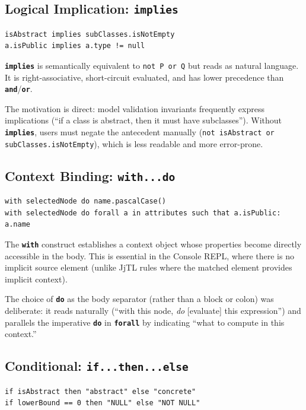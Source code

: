 \documentclass[11pt,a4paper]{article}
\newcommand{\jjtl}{\textsf{JjTL}}
\newcommand{\kw}[1]{\texttt{\textbf{#1}}}
\begin{document}
\subsection{Logical Implication: \texttt{implies}}

\begin{lstlisting}[style=jjel,numbers=none]
isAbstract implies subClasses.isNotEmpty
a.isPublic implies a.type != null
\end{lstlisting}

\kw{implies} is semantically equivalent to \texttt{not P or Q} but reads as natural language. It is right-associative, short-circuit evaluated, and has lower precedence than \kw{and}/\kw{or}.

The motivation is direct: model validation invariants frequently express implications (``if a class is abstract, then it must have subclasses''). Without \kw{implies}, users must negate the antecedent manually (\texttt{not isAbstract or subClasses.isNotEmpty}), which is less readable and more error-prone.


\subsection{Context Binding: \texttt{with...do}}

\begin{lstlisting}[style=jjel,numbers=none]
with selectedNode do name.pascalCase()
with selectedNode do forall a in attributes such that a.isPublic: a.name
\end{lstlisting}

The \kw{with} construct establishes a context object whose properties become directly accessible in the body. This is essential in the Console REPL, where there is no implicit source element (unlike \jjtl{} rules where the matched element provides implicit context).

The choice of \kw{do} as the body separator (rather than a block or colon) was deliberate: it reads naturally (``with this node, \emph{do} [evaluate] this expression'') and parallels the imperative \kw{do} in \kw{forall} by indicating ``what to compute in this context.''


\subsection{Conditional: \texttt{if...then...else}}

\begin{lstlisting}[style=jjel,numbers=none]
if isAbstract then "abstract" else "concrete"
if lowerBound == 0 then "NULL" else "NOT NULL"
\end{lstlisting}
\end{document}
